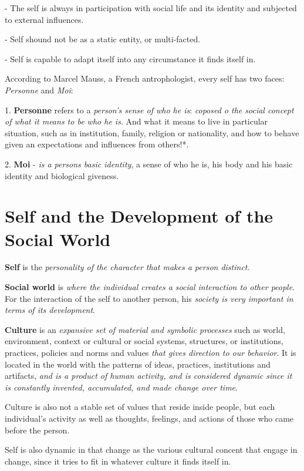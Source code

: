 \documentclass[12pt, UTF8]{article}
\begin{document}
	- The self is always in participation with social life and its identity and subjected to external influences.
	
	- Self shound not be as a static entity, or multi-facted.
	
	- Self is capable to adapt itself into any circumstance it finds itself in.
	
	According to Marcel Mauss, a French antrophologist, every self has two faces: \textit{Personne} and \textit{Moi}:
	
	1. \textbf{Personne} refers to a \textit{person's sense of who he is}: \emph{coposed o the social concept of what it means to be who he is}.  And what it means to live in particular situation, such as in institution, family, religion or nationality, and how to behave given an expectations and influences from others!*.
	
	2. \textbf{Moi} - \emph{is a persons basic identity}, a sense of who he is, his body and his basic identity and biological giveness.
	
	\section{Self and the Development of the Social World}
	
	\textbf{Self} is the \emph{personality of the character that makes a person distinct.}
	
	\textbf{Social world} is \emph{where the individual creates a social interaction to other people}. For the interaction of the self to another person, his \textit{society is very important in terms of its development}.
	
	\textbf{Culture} is an \emph{expansive set of material and symbolic processes} such as world, environment, context or cultural or social systems, structures, or institutions, practices, policies and norms and values \emph{that gives direction to our behavior}. It is located in the world with the patterns of ideas, practices, institutions and artifacts, \textit{and is a product of human activity, and is considered dynamic since it is constantly invented, accumulated, and made change over time}.
	
	Culture is also not a stable set of values that reside inside people, but each individual's activity as well as thoughts, feelings, and actions of those who came before the person.
	
	Self is also dynamic in that change as the various cultural concent that engage in change, since it tries to fit in whatever culture it finds itself in.
	
\end{document}
